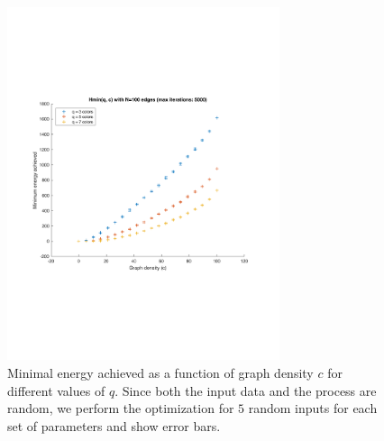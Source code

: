 \documentclass{article}
\begin{document}
  \begin{figure}
    \begin{center}
      \includegraphics[width=8cm]{figures/cost-vs-graph-density.pdf}
    \end{center}
    \label{Fig:cost-vs-density}
    \caption{Minimal energy achieved as a function of graph density $c$ for different values of $q$. Since both the input data and the process are random, we perform the optimization for $5$ random inputs for each set of parameters and show error bars.}
  \end{figure}
\end{document}
